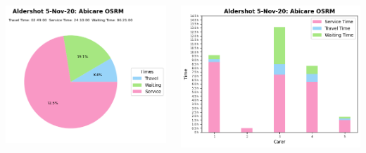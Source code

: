 \documentclass[usenames,dvipsnames]{beamer}
\begin{document}
\begin{frame} %
	\begin{columns}
		\begin{minipage}[c][0.45\textheight][c]{\linewidth}
			\centering
			\includegraphics[width=1\linewidth]{figures/5_Nov_20_Aldershot_time_info_abiosrm}
		\end{minipage}
		\begin{minipage}[c][0.45\textheight][c]{\linewidth}
			\vspace{5mm}
			\centering
			\includegraphics[width=1\linewidth]{figures/5_Nov_20_Aldershot_workload_abiosrm}

\end{minipage}
\end{columns}
\end{frame}
\end{document}
